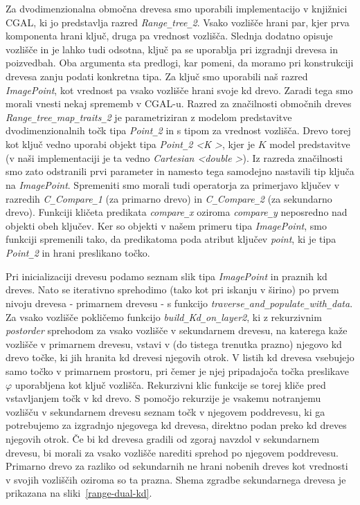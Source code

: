 \documentclass[a4paper, 12pt]{book}
\newcommand{\U}{\texttt{\_}}
\begin{document}
Za dvodimenzionalna območna drevesa smo uporabili implementacijo v knjiž\-ni\-ci CGAL, ki jo predstavlja razred \textit{Range\texttt{\_}tree\texttt{\_}2}. Vsako vozlišče hrani par, kjer prva komponenta hrani ključ, druga pa vrednost vozlišča. Slednja dodatno opisuje vozlišče in je lahko tudi odsotna, ključ pa se uporablja pri izgradnji drevesa in poizvedbah. Oba argumenta sta predlogi, kar pomeni, da moramo pri konstrukciji drevesa zanju podati konkretna tipa. 
Za ključ smo uporabili naš razred \textit{ImagePoint}, kot vrednost pa vsako vozlišče hrani svoje kd drevo. Zaradi tega smo morali vnesti nekaj sprememb v CGAL-u. Razred za značilnosti območnih dreves \textit{Range\U tree\U map\U traits\U 2} je parametriziran z modelom predstavitve dvodimenzionalnih točk tipa \textit{Point\U 2} in s tipom za vrednost vozlišča. Drevo torej kot ključ vedno uporabi objekt tipa \textit{Point\U 2 \textless K \textgreater}, kjer je $K$ model predstavitve (v naši implementaciji je ta vedno \textit{Cartesian \textless double \textgreater}). Iz razreda značilnosti smo zato odstranili prvi parameter in namesto tega samodejno nastavili tip ključa na \textit{ImagePoint}. Spremeniti smo morali tudi operatorja za primerjavo ključev v razredih \textit{C\U Compare\U 1} (za primarno drevo) in \textit{C\U Compare\U 2} (za sekundarno drevo). Funkciji kličeta predikata \textit{compare\U x} oziroma \textit{compare\U y} neposredno nad objekti obeh ključev. Ker so objekti v našem primeru tipa \textit{ImagePoint}, smo funkciji spremenili tako, da predikatoma poda atribut ključev \textit{point}, ki je tipa \textit{Point\U 2} in hrani preslikano točko.

Pri inicializaciji drevesu podamo seznam slik tipa \textit{ImagePoint} in praznih kd dreves. Nato se iterativno sprehodimo (tako kot pri iskanju v širino) po prvem nivoju drevesa - primarnem drevesu - s funkcijo \textit{traverse\U and\U popu\-la\-te\U with\U data}. Za vsako vozlišče pokličemo funkcijo \textit{build\U Kd\U on\U la\-yer2}, ki z rekurzivnim \textit{postorder} sprehodom za vsako vozlišče v sekundarnem drevesu, na katerega kaže vozlišče v primarnem drevesu, vstavi v (do tistega trenutka prazno) njegovo kd drevo točke, ki jih hranita kd drevesi njegovih otrok. V listih kd drevesa vsebujejo samo točko v primarnem prostoru, pri čemer je njej pripadajoča točka preslikave $\varphi$ uporabljena kot ključ vozlišča. Rekurzivni klic funkcije se torej kliče pred vstavljanjem točk v kd drevo. S pomočjo rekurzije je vsakemu notranjemu vozlišču v sekundarnem drevesu seznam točk v njegovem poddrevesu, ki ga potrebujemo za izgradnjo njegovega kd drevesa, direktno podan preko kd dreves njegovih otrok. Če bi kd drevesa gradili od zgoraj navzdol v sekundarnem drevesu, bi morali za vsako vozlišče narediti sprehod po njegovem poddrevesu. Primarno drevo za razliko od sekundarnih ne hrani nobenih dreves kot vrednosti v svojih vozliščih oziroma so ta prazna. Shema zgradbe sekundarnega drevesa je prikazana na sliki~\ref{range-dual-kd}.
\end{document}
